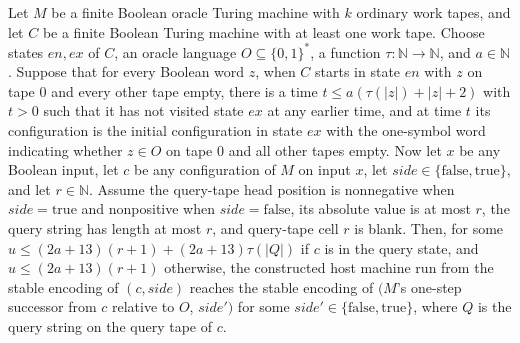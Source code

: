 \begin{theorem}
\label{Turing.oracleHost_step}
\leanok
{}
Let $M$ be a finite Boolean oracle Turing machine with $k$ ordinary work tapes, and let
$C$ be a finite Boolean Turing machine with at least one work tape. Choose states
$en,ex$ of $C$, an oracle language $O\subseteq\{0,1\}^*$, a function
$\tau:\mathbb{N}\to\mathbb{N}$, and $a\in\mathbb{N}$. Suppose that for every Boolean
word $z$, when $C$ starts in state $en$ with $z$ on tape $0$ and every other tape empty,
there is a time $t\le a(\tau(|z|)+|z|+2)$ with $t>0$ such that it has not visited state
$ex$ at any earlier time, and at time $t$ its configuration is the initial configuration
in state $ex$ with the one-symbol word indicating whether $z\in O$ on tape $0$ and all
other tapes empty. Now let $x$ be any Boolean input, let $c$ be any configuration of $M$
on input $x$, let $side\in\{\mathrm{false},\mathrm{true}\}$, and let $r\in\mathbb{N}$.
Assume the query-tape head position is nonnegative when $side=\mathrm{true}$ and
nonpositive when $side=\mathrm{false}$, its absolute value is at most $r$, the query
string has length at most $r$, and query-tape cell $r$ is blank. Then, for some $u\le
(2a+13)(r+1)+(2a+13)\tau(|Q|)$ if $c$ is in the query state, and $u\le(2a+13)(r+1)$
otherwise, the constructed host machine run from the stable encoding of $(c,side)$
reaches the stable encoding of $(M$'s one-step successor from $c$ relative to $O$,
$side')$ for some $side'\in\{\mathrm{false},\mathrm{true}\}$, where $Q$ is the query
string on the query tape of $c$.
\end{theorem}

